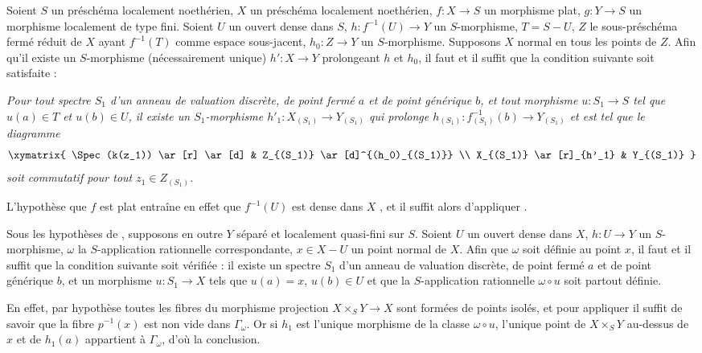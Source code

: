 \begin{corollary}[20.4.9]
\label{IV.20.4.9}
Soient $S$ un préschéma localement noethérien, $X$ un préschéma localement noethérien, $f:X\to S$ un morphisme plat, $g:Y\to S$ un morphisme localement de type fini.
Soient $U$ un ouvert dense dans $S$, $h:f^{-1}(U)\to Y$ un $S$-morphisme, $T=S-U$, $Z$ le sous-préschéma fermé réduit de $X$ ayant $f^{-1}(T)$ comme espace sous-jacent, $h_0:Z\to Y$ un $S$-morphisme.
Supposons $X$ normal en tous les points de $Z$.
Afin qu'il existe un $S$-morphisme (nécessairement unique) $h':X\to Y$ prolongeant $h$ et $h_0$, il faut et il suffit que la condition suivante soit satisfaite :

\emph{Pour tout spectre $S_1$ d'un anneau de valuation discrète, de point fermé $a$ et de point générique $b$, et tout morphisme $u:S_1\to S$ tel que $u(a)\in T$ et $u(b)\in U$, il existe un $S_1$-morphisme $h'_1:X_{(S_1)}\to Y_{(S_1)}$ qui prolonge $h_{(S_1)}:f_{(S_1)}^{-1}(b)\to Y_{(S_1)}$ et est tel que le diagramme}
\[
  \xymatrix{
  \Spec(k(z_1)) \ar[r] \ar[d] & Z_{(S_1)} \ar[d]^{(h_0)_{(S_1)}} \\
  X_{(S_1)} \ar[r]_{h'_1} & Y_{(S_1)}
  }
\]
\emph{soit commutatif pour tout $z_1\in Z_{(S_1)}$.}

L'hypothèse que $f$ est plat entraîne en effet que $f^{-1}(U)$ est dense dans $X$ , et il suffit alors d'appliquer .
\end{corollary}

\begin{corollary}[20.4.10]
\label{IV.20.4.10}
Sous les hypothèses de , supposons en outre $Y$ séparé et localement quasi-fini sur $S$.
Soient $U$ un ouvert dense dans $X$, $h:U\to Y$ un $S$-morphisme, $\omega$ la $S$-application rationnelle correspondante, $x\in X-U$ un point normal de $X$.
Afin que $\omega$ soit définie au point $x$, il faut et il suffit que la condition suivante soit vérifiée : il existe un spectre $S_1$ d'un anneau de valuation discrète, de point fermé $a$ et de point générique $b$, et un morphisme $u:S_1\to X$
tels que $u(a)=x$, $u(b)\in U$ et que la $S$-application rationnelle $\omega\circ u$ soit partout définie.

En effet, par hypothèse toutes les fibres du morphisme projection $X\times_S Y\to X$ sont formées de points isolés, et pour appliquer  il suffit de savoir que la fibre $p^{-1}(x)$ est non vide dans $\Gamma_\omega$.
Or si $h_1$ est l'unique morphisme de la classe $\omega\circ u$, l'unique point de $X\times_S Y$ au-dessus de $x$ et de $h_1(a)$ appartient à $\Gamma_\omega$, d'où la conclusion.
\end{corollary}

